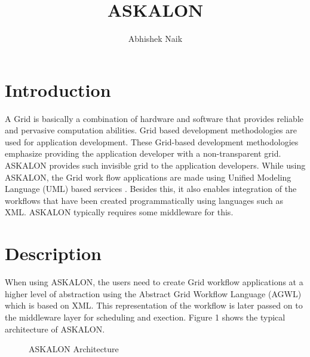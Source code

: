 \documentclass[9pt,twocolumn,twoside]{../../styles/osajnl}
\title{ASKALON}
\author[1,*]{Abhishek Naik}
\affil[1]{School of Informatics and Computing, Bloomington, IN 47408, U.S.A.}
\affil[*]{Corresponding authors: ahnaik@indiana.edu}
\begin{document}
\maketitle

\section{Introduction}

A Grid is basically a combination of hardware and software that
provides reliable and pervasive computation abilities.  Grid based
development methodologies are used for application development.  These
Grid-based development methodologies emphasize providing the
application developer with a non-transparent grid.  ASKALON provides
such invisible grid to the application developers.  While using
ASKALON, the Grid work flow applications are made using Unified
Modeling Language (UML) based services \cite{Workflow-book}.  Besides
this, it also enables integration of the workflows that have been
created programmatically using languages such as XML.  ASKALON
typically requires some middleware for this.

\section{Description}

When using ASKALON, the users need to create Grid workflow
applications at a higher level of abstraction using the Abstract Grid
Workflow Language (AGWL) which is based on XML.  This representation
of the workflow is later passed on to the middleware layer for
scheduling and exection.  Figure 1 shows the typical architecture of
ASKALON.

\begin{figure}[htbp]
  \centering
  \caption{ASKALON Architecture \cite{Workflow-book}}
\end{figure}
\end{document}
